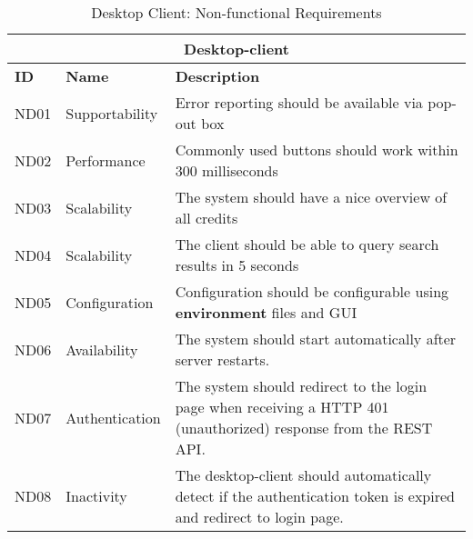 \documentclass[a4paper,12pt]{article}
\begin{document}
\begin{table}
    \centering
    \begin{tabular}{|p{1cm}|p{3.5cm}|p{11cm}|} 
        \hline
        \multicolumn{3}{|c|}{\textbf{Desktop-client}}  \\ 
        \hline
        \textbf{ID} & \textbf{Name} & \textbf{Description} \\
        \hline
        ND01 & Supportability &  Error reporting should be available via pop-out box \\
        \hline
        ND02 & Performance &  Commonly used buttons should work within 300 milliseconds \\
        \hline
        ND03 & Scalability &  The system should have a nice overview of all credits \\
        \hline
        ND04 & Scalability &  The client should be able to query search results in 5 seconds \\
        \hline
        ND05 & Configuration & Configuration should be configurable using \textbf{environment} files and GUI \\
        \hline
        ND06 & Availability &  The system should start automatically after server restarts. \\
        \hline
        ND07 & Authentication & The system should redirect to the login page when receiving a HTTP 401 (unauthorized) response from the REST API. \\
        \hline
        ND08 & Inactivity & The desktop-client should automatically detect if the authentication token is expired and redirect to login page. \\ 
        \hline
    \end{tabular}
    \caption{Desktop Client: Non-functional Requirements}
    \label{tab:desktop_client_nfunreq}
\end{table}
\end{document}
